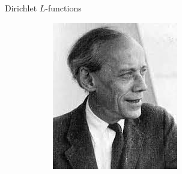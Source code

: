 \documentclass[10pt]{beamer}
\begin{document}
\begin{frame}{Dirichlet $L$-functions}
\begin{figure}[H]
\begin{subfigure}[b]{0.3\textwidth}
\includegraphics[width=.7\textwidth]{EArtin.jpeg}
\end{subfigure}
\end{figure}\vspace{-5pt}

\end{frame}
\end{document}
